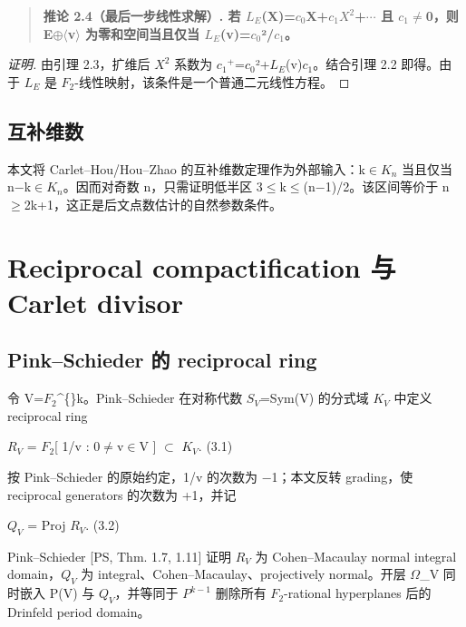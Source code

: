 \documentclass[11pt]{ctexart}
\begin{document}
\begin{quote}\textbf{推论 2.4（最后一步线性求解）. 若 \ensuremath{L_{E}}(X)=\ensuremath{c_0}X+\ensuremath{c_1}\ensuremath{X^2}+\ensuremath{\cdots} 且 \ensuremath{c_1}\ensuremath{\ne}0，则 E\ensuremath{\oplus}\ensuremath{\langle}v\ensuremath{\rangle} 为零和空间当且仅当 \ensuremath{L_{E}}(v)=\ensuremath{c_0}²/\ensuremath{c_1}。}\end{quote}

\begin{proof}[证明] 

由引理 2.3，扩维后 \ensuremath{X^2} 系数为 \ensuremath{c_1}\ensuremath{^+}=\ensuremath{c_0}²+\ensuremath{L_{E}}(v)\ensuremath{c_1}。结合引理 2.2 即得。由于 \ensuremath{L_{E}} 是 \ensuremath{F_2}-线性映射，该条件是一个普通二元线性方程。

\end{proof}

\subsection{互补维数}

本文将 Carlet–Hou/Hou–Zhao 的互补维数定理作为外部输入：k\ensuremath{\in}\ensuremath{K_{n}} 当且仅当 n−k\ensuremath{\in}\ensuremath{K_{n}}。因而对奇数 n，只需证明低半区 3\ensuremath{\le}k\ensuremath{\le}(n−1)/2。该区间等价于 n\ensuremath{\ge}2k+1，这正是后文点数估计的自然参数条件。

\section{Reciprocal compactification 与 Carlet divisor}

\subsection{Pink–Schieder 的 reciprocal ring}

令 V=\ensuremath{F_2}\textasciicircum\{\}k。Pink–Schieder 在对称代数 \ensuremath{S_{V}}=Sym(V) 的分式域 \ensuremath{K_{V}} 中定义 reciprocal ring

\ensuremath{R_{V}} = \ensuremath{F_2}[ 1/v : 0\ensuremath{\ne}v\ensuremath{\in}V ] \ensuremath{\subset} \ensuremath{K_{V}}.    (3.1)

按 Pink–Schieder 的原始约定，1/v 的次数为 −1；本文反转 grading，使 reciprocal generators 的次数为 +1，并记

\ensuremath{Q_{V}} = Proj \ensuremath{R_{V}}.    (3.2)

Pink–Schieder [PS, Thm. 1.7, 1.11] 证明 \ensuremath{R_{V}} 为 Cohen–Macaulay normal integral domain，\ensuremath{Q_{V}} 为 integral、Cohen–Macaulay、projectively normal。开层 \ensuremath{\Omega}\_V 同时嵌入 P(V) 与 \ensuremath{Q_{V}}，并等同于 \ensuremath{P^{k−1}} 删除所有 \ensuremath{F_2}-rational hyperplanes 后的 Drinfeld period domain。
\end{document}
